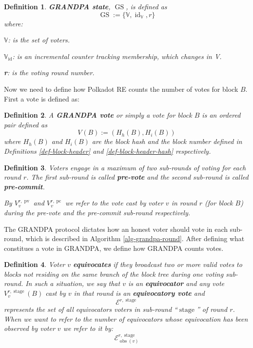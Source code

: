 \documentclass{article}
\newcommand{\assign}{:=}
\newcommand{\nosymbol}{}
\newcommand{\tmop}[1]{\ensuremath{\operatorname{#1}}}
\newcommand{\tmstrong}[1]{\textbf{#1}}
\newcommand{\tmtextbf}[1]{{\bfseries{#1}}}
\newcommand{\tmtexttt}[1]{{\ttfamily{#1}}}
\newcommand{\tmverbatim}[1]{{\ttfamily{#1}}}
\newtheorem{definition}{Definition}
\providecommand{\nosymbol}{}
\providecommand{\tmop}[1]{\ensuremath{\mathrm{#1}}}
\providecommand{\tmstrong}[1]{\tmtextbf{#1}}
\providecommand{\tmtextbf}[1]{\tmtextbf{#1}}
\providecommand{\tmverbatim}[1]{\tmtexttt{#1}}
\newtheorem{definition}{Definition}
\begin{document}
\begin{definition}
  {\tmstrong{GRANDPA state}}, $\tmop{GS}$, is defined as
  \[ \tmop{GS} \assign \{\mathbb{V}, \tmop{id}_{\mathbb{V}}, r\} \]
  where:
  
  $\mathbb{V}$: is the set of voters.
  
  {\tmstrong{$\mathbb{V}_{\tmop{id}}$}}: is an incremental counter tracking
  \tmverbatim{}membership, which changes in V.
  
  {\tmstrong{r}}: is the voting round number.
\end{definition}

Now we need to define how Polkadot RE counts the number of votes for block
$B$. First a vote is defined as:

\begin{definition}
  \label{def-vote}A {\tmstrong{GRANDPA vote }}or simply a vote for block $B$
  is an ordered pair defined as
  \[ V_{\nosymbol} (B) \assign (H_h (B), H_i (B)) \]
  where $H_h (B)$ and $H_i (B)$ are the block hash and the block number
  defined in Definitions \ref{def-block-header} and
  \ref{def-block-header-hash} respectively.
\end{definition}

\begin{definition}
  Voters engage in a maximum of two sub-rounds of voting for each round $r$.
  The first sub-round is called {\tmstrong{pre-vote}} and\tmverbatim{} the
  second sub-round is called {\tmstrong{pre-commit}}.
  
  By {\tmstrong{$V_v^{r, \tmop{pv}}$}} and {\tmstrong{$V_v^{r, \tmop{pc}}$}}
  we refer to the vote cast by voter $v$ in round $r$ (for block $B$) during
  the pre-vote and the pre-commit sub-round respectively.
\end{definition}

The GRANDPA protocol dictates how an honest voter should vote in each
sub-round, which is described in Algorithm \ref{alg-grandpa-round}. After
defining what constitues a vote in GRANDPA, we define how GRANDPA counts
votes.

\begin{definition}
  Voter $v$ {\tmstrong{equivocates}} if they broadcast two or more valid votes
  to blocks not residing on the same branch of the block tree during one
  voting sub-round. In such a situation, we say that $v$ is an
  {\tmstrong{equivocator}} and any vote $V_v^{r, \tmop{stage}} (B)$ cast by
  $v$ in that round is an {\tmstrong{equivocatory vote}} and
  \[ \mathcal{E}^{r, \tmop{stage}} \]
  represents the set of all equivocators voters in sub-round
  ``$\tmop{stage}$'' of round $r$. When we want to refer to the number
  of\tmverbatim{} equivocators whose equivocation has been observed by voter
  $v$ we refer to it by:
  \[ \mathcal{E}^{r, \tmop{stage}}_{\tmop{obs} (v)} \]
  
\end{definition}
\end{document}
